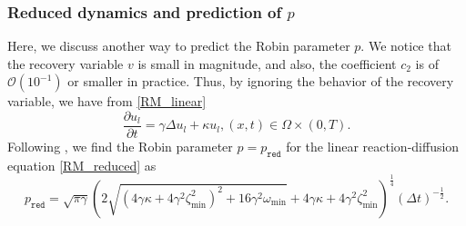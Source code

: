\documentclass[11pt]{article}
\begin{document}
\subsubsection{Reduced dynamics and prediction of $p$}
Here, we discuss another way to predict the Robin parameter $p$. We notice that the recovery variable $v$ is small in magnitude, and also, the coefficient $c_2$ is of $\mathcal{O}(10^{-1})$ or smaller in practice. Thus, by ignoring the behavior of the recovery variable, we have from \eqref{RM_linear}
\begin{equation}\label{RM_reduced}
\frac{\partial u_l}{\partial t}  = \gamma \Delta u_l +\kappa u_l,  (x,t)\in\Omega\times(0,T).
\end{equation}
Following \cite{gander2010optimized}, we find the Robin parameter $p=p_{\texttt{red}}$ for the linear reaction-diffusion equation \eqref{RM_reduced} as
\begin{equation}
p_{\texttt{red}}=\sqrt{\pi\gamma}\left( 2\sqrt{(4\gamma\kappa + 4\gamma^2\zeta_{\min}^2)^2 +16\gamma^2\omega_{\min}} + 4\gamma\kappa + 4\gamma^2\zeta_{\min}^2 \right)^{\frac{1}{4}} \left( \Delta t \right)^{-\frac{1}{2}}.
\end{equation}
\end{document}

